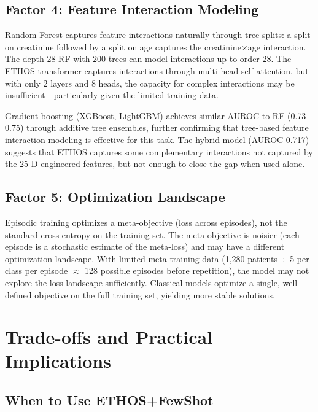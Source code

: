 \subsection{Factor 4: Feature Interaction Modeling}

Random Forest captures feature interactions naturally through tree splits: a split on creatinine followed by a split on age captures the creatinine$\times$age interaction. The depth-28 RF with 200 trees can model interactions up to order 28. The ETHOS transformer captures interactions through multi-head self-attention, but with only 2 layers and 8 heads, the capacity for complex interactions may be insufficient---particularly given the limited training data.

Gradient boosting (XGBoost, LightGBM) achieves similar AUROC to RF (0.73--0.75) through additive tree ensembles, further confirming that tree-based feature interaction modeling is effective for this task. The hybrid model (AUROC 0.717) suggests that ETHOS captures some complementary interactions not captured by the 25-D engineered features, but not enough to close the gap when used alone.

\subsection{Factor 5: Optimization Landscape}

Episodic training optimizes a meta-objective (loss across episodes), not the standard cross-entropy on the training set. The meta-objective is noisier (each episode is a stochastic estimate of the meta-loss) and may have a different optimization landscape. With limited meta-training data (1,280 patients $\div$ 5 per class per episode $\approx$ 128 possible episodes before repetition), the model may not explore the loss landscape sufficiently. Classical models optimize a single, well-defined objective on the full training set, yielding more stable solutions.

\section{Trade-offs and Practical Implications}

\subsection{When to Use ETHOS+FewShot}

